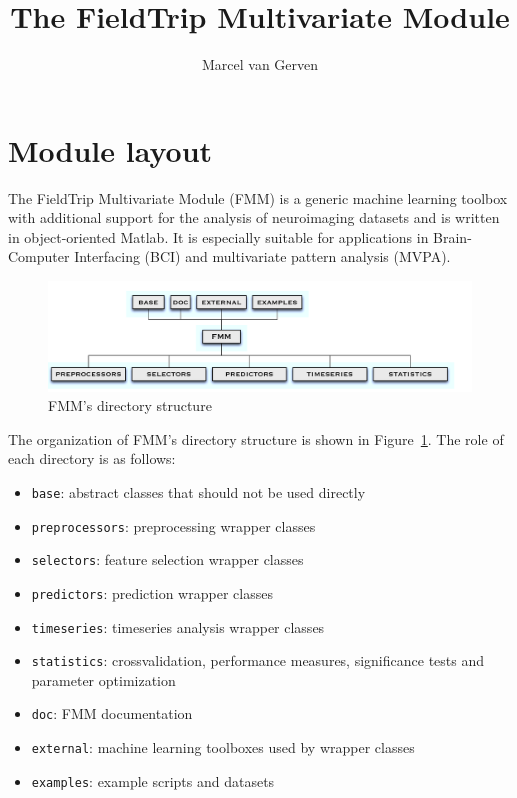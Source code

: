 \documentclass{article}
\title{The FieldTrip Multivariate Module}
\author{Marcel van Gerven}
\renewcommand{\t}[1]{{\tt #1}}
\begin{document}
\maketitle

\section{Module layout}

The FieldTrip Multivariate Module (FMM) is a generic machine learning toolbox with additional support for the analysis of neuroimaging datasets and is written in object-oriented Matlab. It is especially suitable for applications in Brain-Computer Interfacing (BCI) and multivariate pattern analysis (MVPA).

\begin{figure}[ht]
\begin{center}
\includegraphics[width=\textwidth]{figures/organization.pdf}
\caption{FMM's directory structure}
\end{center}
\label{dir}
\end{figure}

The organization of FMM's directory structure is shown in Figure~\ref{dir}. The role of each directory is as follows:
\begin{itemize}
\item \t{base}: abstract classes that should not be used directly 
\item \t{preprocessors}: preprocessing wrapper classes
\item \t{selectors}: feature selection wrapper classes
\item \t{predictors}: prediction wrapper classes
\item \t{timeseries}: timeseries analysis wrapper classes
\item \t{statistics}: crossvalidation, performance measures, significance tests and parameter optimization
\item \t{doc}: FMM documentation
\item \t{external}: machine learning toolboxes used by wrapper classes
\item \t{examples}: example scripts and datasets
\end{itemize}
\end{document}
